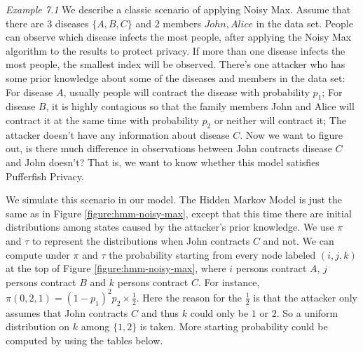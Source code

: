 \textit{Example 7.1} We describe a classic scenario of applying Noisy Max. Assume that there
are $3$ diseases $\{A,B,C\}$ and $2$ members ${John, Alice}$ in the data set. People can observe which disease
infects the most people, after applying the Noisy Max algorithm to the results to protect privacy. 
If more than one disease
infects the most people, the smallest index will be observed.
There's one attacker who has some prior knowledge about some of the diseases and members in the data set:
For disease $A$, usually people will contract the disease with probability $p_1$;
For disease $B$, it is highly contagious so that the family members John and Alice will contract
it at the same time with probability $p_2$ or neither will contract it;
The attacker doesn't have any information about disease $C$. Now we want to figure out,
is there much difference in observations between John contracts disease $C$ and John doesn't?
That is, we want to know whether this model satisfies Pufferfish Privacy.

We simulate this scenario in our model.
The Hidden Markov Model is just the same as in Figure \ref{figure:hmm-noisy-max}, except that
this time there are initial distributions among states caused by the attacker's prior knowledge.
We use $\pi$ and $\tau$ to represent the distributions when John contracts $C$ and not. 
We can compute under $\pi$ and $\tau$ the probability starting from every node labeled $(i,j,k)$ at the top of Figure \ref{figure:hmm-noisy-max},
where $i$ persons contract $A$, $j$ persons contract $B$ and $k$ persons contract $C$.
For instance, $\pi (0,2,1) = (1-p_1)^2 p_2 \times \frac{1}{2}$. Here the reason for the $\frac{1}{2}$
is that the attacker only assumes that John contracts $C$ and thus $k$ could only be $1$ or $2$. So a uniform
distribution on $k$ among $\{1,2\}$ is taken. More starting probability could be computed by using the
tables below.

